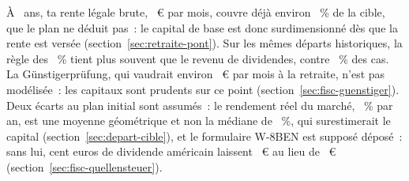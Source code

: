 \`A \AlterYannBasis~ans, ta rente l\'egale brute, \RenteBeiZielalter~€ par mois, couvre d\'ej\`a
environ \RenteLegalePartCible~\% de la cible, que le plan ne d\'eduit pas~: le capital de base est
donc surdimensionn\'e d\`es que la rente est vers\'ee (section~\ref{sec:retraite-pont}). Sur les m\^emes
d\'eparts historiques, la r\`egle des \TauxRetrait~\% tient plus souvent que le revenu de dividendes,
\RetraitHistMemesDepartsProzent{} contre \RueckspielTenusProzent~\% des cas. La G\"unstigerpr\"ufung, qui vaudrait environ \GuenstigerEconomieMois~€ par mois \`a
la retraite, n'est pas mod\'elis\'ee~: les capitaux sont prudents sur ce point
(section~\ref{sec:fisc-guenstiger}). Deux \'ecarts au plan initial sont assum\'es~: le rendement r\'eel
du march\'e, \RenditeReal~\% par an, est une moyenne g\'eom\'etrique et non la m\'ediane de
\RenditeReelleMediane~\%, qui surestimerait le capital (section~\ref{sec:depart-cible}), et le
formulaire W-8BEN est suppos\'e d\'epos\'e~: sans lui, cent euros de dividende am\'ericain laissent
\NettoUsSansFormulaire~€ au lieu de \NettoUs~€ (section~\ref{sec:fisc-quellensteuer}).

\clearpage
